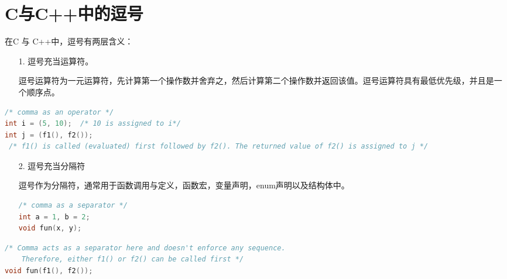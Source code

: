 \section{C与C++中的逗号}
\begin{frame}[fragile]\ft{\secname}
  在C 与 C++中，逗号有两层含义：
  \begin{enumerate}
\item[1.] 逗号充当运算符。
\item[] 逗号运算符为一元运算符，先计算第一个操作数并舍弃之，然后计算第二个操作数并返回该值。逗号运算符具有最低优先级，并且是一个顺序点。
\end{enumerate}
\end{frame}

\begin{frame}[fragile]\ft{\secname}
    \begin{lstlisting}[language=c,backgroundcolor=\color{red!10}]
/* comma as an operator */
int i = (5, 10);  /* 10 is assigned to i*/
int j = (f1(), f2());
 /* f1() is called (evaluated) first followed by f2(). The returned value of f2() is assigned to j */    
  \end{lstlisting}
\end{frame}

\begin{frame}[fragile]\ft{\secname}
 \begin{enumerate}
\item[2.] 逗号充当分隔符
\item[] 逗号作为分隔符，通常用于函数调用与定义，函数宏，变量声明，enum声明以及结构体中。
  \begin{lstlisting}[language=c,backgroundcolor=\color{red!10}]
/* comma as a separator */
int a = 1, b = 2;
void fun(x, y);    
  \end{lstlisting}
\end{enumerate}
\end{frame}


\begin{frame}[fragile]\ft{\secname}

\begin{lstlisting}[language=c,backgroundcolor=\color{red!10}]
/* Comma acts as a separator here and doesn't enforce any sequence. 
    Therefore, either f1() or f2() can be called first */
void fun(f1(), f2());  
\end{lstlisting}
\end{frame}

